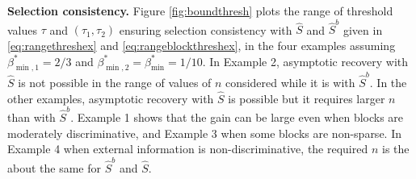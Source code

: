 \documentclass[aos]{imsart}
\theoremstyle{plain}
\newcommand{\bs}{\boldsymbol}
\begin{document}
\bigskip
\noindent\textbf{Selection consistency.}
Figure \ref{fig:boundthresh} plots the range of threshold values $\tau$ and $(\tau_1,\tau_2)$ ensuring selection consistency with $\hat{S}$ and $\hat{S}^{b}$ given in \eqref{eq:rangethreshex} and \eqref{eq:rangeblockthreshex},
in the four examples assuming $\beta^*_{\min,1}=2/3$  and $\beta^*_{\min,2}=\beta^*_{\min}=1/10$. 
In Example 2, asymptotic recovery with $\hat{S}$ is not possible in the range of values of $n$ considered while it is with $\hat{S}^{b}$.
In the other examples, asymptotic recovery with $\hat{S}$ is possible but it requires larger $n$ than with $\hat{S}^b$.
Example 1 shows that the gain can be large even when blocks are moderately discriminative, and Example 3 when some blocks are non-sparse. 
\color{black}
In Example 4 when external information is non-discriminative, the required $n$ is the about the same for $\hat{S}^{b}$ and $\hat{S}$. 
\end{document}

